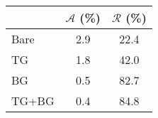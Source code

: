 \begin{tabular}{lSS}
\toprule
 & {$\mathscr{A}$ (\unit{\percent})} & {$\mathscr{R}$ (\unit{\percent})} \\
\midrule
Bare & 2.9 & 22.4 \\
TG & 1.8 & 42.0 \\
BG & 0.5 & 82.7 \\
TG+BG & 0.4 & 84.8 \\
\bottomrule
\end{tabular}
